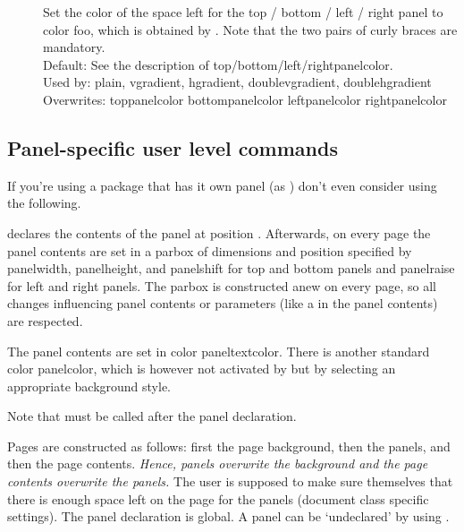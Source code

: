 \begin{slide}
\begin{description}
 \item[]
    Set the color of the space left for the top / bottom / left / right panel
    to color foo, which is obtained by
    .
    Note that the two pairs of curly braces are mandatory. \\
    Default: See the description of top/bottom/left/rightpanelcolor.\\
    Used by: plain, vgradient, hgradient, doublevgradient, doublehgradient\\
    Overwrites: toppanelcolor bottompanelcolor leftpanelcolor rightpanelcolor

  \end{description}

  \newslide

  \subsection{Panel-specific user level commands}
  If you're using a package that has it own panel (as
  \href{ftp://ftp.dante.de/tex-archive/help/Catalogue/entries/pdfscreen.html}%
  {}) don't even consider using the following.

  declares the contents  of the panel at position .
  Afterwards, on every page the panel contents are set in a parbox of
  dimensions and position specified by panelwidth,
  panelheight,  and panelshift for
  top and bottom panels and panelraise for left and right panels. The
  parbox is constructed anew on every page, so all changes influencing panel
  contents or parameters (like a  in the panel contents) are
  respected.

  The panel contents are set in color paneltextcolor. There is
  another standard color panelcolor, which is however not activated by
   but by selecting an appropriate background style.

  Note that  must be called after the panel
  declaration.

  \newslide

  Pages are constructed as follows: first the page background, then
  the panels, and then the page contents. \emph{Hence, panels overwrite the background
  and the page contents overwrite the panels.} The user is supposed to make sure
  themselves that there is enough space left on the page for the panels
  (document class specific settings).  The panel declaration is global. A panel
  can be `undeclared' by using .


\end{slide}
